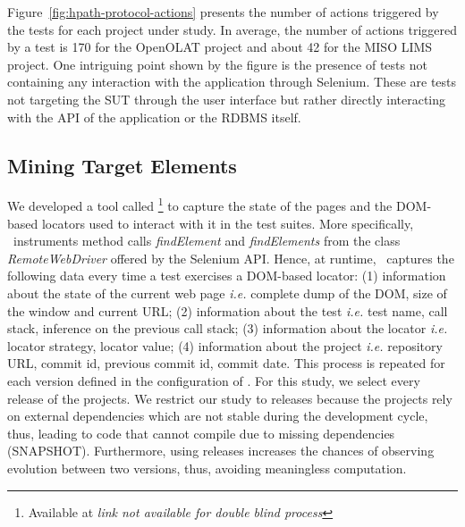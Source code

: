 Figure~\ref{fig:hpath-protocol-actions} presents the number of actions triggered by the tests for each project under study. In average, the number of actions triggered by a test is 170 for the OpenOLAT project and about 42 for the MISO LIMS project. One intriguing point shown by the figure is the presence of tests not containing any interaction with the application through Selenium. These are tests not targeting the SUT through the user interface but rather directly interacting with the API of the application or the RDBMS itself.

\subsection{Mining Target Elements}
\label{sec:hpath-protocol-elements}

We developed a tool called \mercator\footnote{Available at \textit{link not available for double blind process}} to capture the state of the pages and the DOM-based locators used to interact with it in the test suites. More specifically, \mercator\ instruments method calls \emph{findElement} and \emph{findElements} from the class \emph{RemoteWebDriver} offered by the Selenium API. Hence, at runtime, \mercator\ captures the following data every time a test exercises a DOM-based locator: (1) information about the state of the current web page \emph{i.e.} complete dump of the DOM, size of the window and current URL; (2) information about the test \emph{i.e.} test name, call stack, inference on the previous call stack; (3) information about the locator \emph{i.e.} locator strategy, locator value; (4) information about the project \emph{i.e.} repository URL, commit id, previous commit id, commit date. This process is repeated for each version defined in the configuration of \mercator. For this study, we select every release of the projects. We restrict our study to releases because the projects rely on external dependencies which are not stable during the development cycle, thus, leading to code that cannot compile due to missing dependencies (SNAPSHOT). Furthermore, using releases increases the chances of observing evolution between two versions, thus, avoiding meaningless computation.

